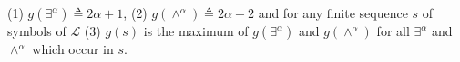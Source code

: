 (1) $g(\exists^\alpha) \triangleq 2\alpha + 1$,
(2) $g(\wedge^\alpha) \triangleq 2\alpha + 2$
and for any finite sequence $s$ of symbols of $\mathcal{L}$
(3) $g(s)$ is the maximum of $g(\exists^\alpha)$ and $g(\wedge^\alpha)$ for all $\exists^\alpha$ and $\wedge^\alpha$ which occur in $s$.
